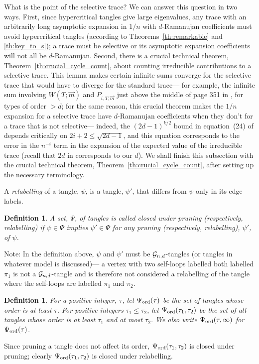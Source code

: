 \documentclass[12pt]{article}
\newtheorem{definition}[theorem]{Definition}
\newcommand{\dtreelike}{{$d$-Ramanujan}}
\newcommand{\ord}{{\rm ord}}
\newcommand{\cg}{{\cal G}}
\newcommand{\cgnd}{\cg_{n,d}}
\newcommand{\tang}{{\psi}}	%
\newcommand{\tset}{{\Psi}}
\begin{document}
What is the point of the selective trace?  We can answer this question
in two ways.  First, since hypercritical 
tangles give large eigenvalues, any trace
with an arbitrarily long asymptotic expansion in $1/n$ with {\dtreelike}
coefficients must avoid hypercritical tangles (according to
Theorems~\ref{th:remarkable} and \ref{th:key_to_s});
a trace must be selective or its asymptotic expansion coefficients 
will not all be {\dtreelike}.
Second, there is a crucial technical theorem, 
Theorem~\ref{th:crucial_cycle_count}, about
counting irreducible contributions to a selective trace.
This lemma makes certain infinite sums converge for the selective trace
that would have to diverge for the standard trace---
for example, the infinite sum involving $W(T;\vec m)$ and $P_{i,T,\vec m}$
just above the middle
of page 351 in \cite{friedman_random_graphs}, for types of order $>d$;
for the same reason, this crucial theorem makes the $1/n$ expansion for
a selective trace have {\dtreelike} coefficients when they don't for a
trace that is not selective--- indeed, the
$(2d-1)^{k/2}$ bound in equation~(24) of \cite{friedman_random_graphs}
depends critically on $2i+2\le\sqrt{2d-1}$, and this equation
corresponds to the error in the $n^{-i}$ term in the expansion of the expected
value of the irreducible
trace (recall that $2d$ in \cite{friedman_random_graphs} corresponds to
our $d$).
We shall finish this subsection
with the crucial technical theorem, Theorem~\ref{th:crucial_cycle_count},
after setting up the necessary terminology.

A {\em relabelling} of a tangle, $\tang$, is a tangle, $\tang'$, that differs
from $\tang$ only in its edge labels.

\begin{definition} A set, $\tset$, of tangles is called {\em closed under
pruning (respectively, relabelling)}
if $\tang\in\tset$ implies $\tang'\in\tset$ for any 
pruning (respectively, relabelling), 
$\tang'$, of $\tang$.
\end{definition}

Note:  In the definition above, $\tang$ and $\tang'$ must be
$\cgnd$-tangles (or tangles in whatever model is discussed)---  a vertex
with two self-loops labelled both labelled $\pi_1$ is not a
$\cgnd$-tangle and is therefore not considered a relabelling of the
tangle where the self-loops are labelled $\pi_1$ and $\pi_2$.

\begin{definition} For a positive integer, $\tau$, let $\tset_\ord(\tau)$ be
the set of tangles whose order is at least $\tau$.
For positive integers $\tau_1\le \tau_2$, let $\tset_\ord(\tau_1,\tau_2)$
be the set of all tangles whose order is at least $\tau_1$ and at
most $\tau_2$.
We also write $\tset_\ord(\tau,\infty)$ for $\tset_\ord(\tau)$.
\end{definition}
Since pruning a tangle does not affect its order, $\tset_\ord(\tau_1,
\tau_2)$ is
closed under pruning; clearly $\tset_\ord(\tau_1,\tau_2)$
is closed under relabelling.
\end{document}
